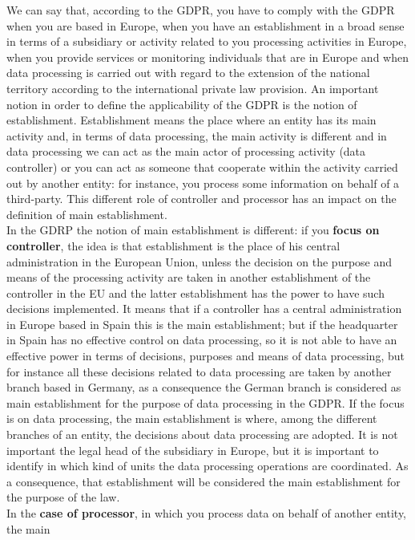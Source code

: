 We can say that, according to the GDPR, you have to comply with the GDPR when you are based in Europe, when you have an establishment in a broad sense in terms of a subsidiary or activity related to you processing activities in Europe, when you provide services or monitoring individuals that are in Europe and when data processing is carried out with regard to the extension of the national territory according to the international private law provision.
An important notion in order to define the applicability of the GDPR is the notion of establishment. Establishment means the place where an entity has its main activity and, in terms of data processing, the main activity is different and in data processing we can act as the main actor of processing activity (data controller) or you can act as someone that cooperate within the activity carried out by another entity: for instance, you process some information on behalf of a third-party. This different role of controller and processor has an impact on the definition of main establishment.\\
In the GDRP the notion of main establishment is different: if you \textbf{focus on controller}, the idea is that establishment is the place of his central administration in the European Union, unless the decision on the purpose and means of the processing activity are taken in another establishment of the controller in the EU and the latter establishment has the power to have such decisions implemented. It means that if a controller has a central administration in Europe based in Spain this is the main establishment; but if the headquarter in Spain has no effective control on data processing, so it is not able to have an effective power in terms of decisions, purposes and means of data processing, but for instance all these decisions related to data processing are taken by another branch based in Germany, as a consequence the German branch is considered as main establishment for the purpose of data processing in the GDPR. If the focus is on data processing, the main establishment is where, among the different branches of an entity, the decisions about data processing are adopted. It is not important the legal head of the subsidiary in Europe, but it is important to identify in which kind of units the data processing operations are coordinated. As a consequence, that establishment will be considered the main establishment for the purpose of the law.\\
In the \textbf{case of processor}, in which you process data on behalf of another entity, the main 

